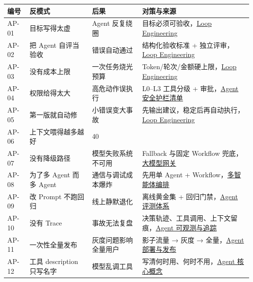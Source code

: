 \documentclass[9pt,a4paper,twocolumn]{ctexart}
\begin{document}
{\footnotesize
\begin{tabular}{|p{}|p{}|p{}|p{}|}
\hline
\textbf{编号} & \textbf{反模式} & \textbf{后果} & \textbf{对策与来源} \\
\hline
AP-01 & 目标写得太虚 & Agent 反复绕圈 & 目标必须可验收，\href{../04-工程实践/02-Loop工程.md}{Loop Engineering} \\
\hline
AP-02 & 把 Agent 自评当验收 & 错误自动通过 & 结构化验收标准 + 独立评审，\href{../04-工程实践/02-Loop工程.md}{Loop Engineering} \\
\hline
AP-03 & 没有成本上限 & 一次任务烧光预算 & Token/轮次/金额硬上限，\href{../04-工程实践/02-Loop工程.md}{Loop Engineering} \\
\hline
AP-04 & 权限给得太大 & 高危动作误执行 & L0–L3 工具分级 + 审批，\href{../06-安全与治理/01-Agent安全护栏清单.md}{Agent 安全护栏清单} \\
\hline
AP-05 & 第一版就自动修 & 小错误变大事故 & 先输出建议，稳定后再自动执行，\href{../04-工程实践/02-Loop工程.md}{Loop Engineering} \\
\hline
AP-06 & 上下文喂得越多越好 & 40\\%
\hline
AP-07 & 没有降级路径 & 模型失败系统不可用 & Fallback 与固定 Workflow 兜底，\href{../04-工程实践/04-大模型网关.md}{大模型网关} \\
\hline
AP-08 & 为了多 Agent 而多 Agent & 通信与调试成本爆炸 & 先用单 Agent + Workflow，\href{../02-Agent/03-多智能体编排.md}{多智能体编排} \\
\hline
AP-09 & 改 Prompt 不跑回归 & 线上静默退化 & 离线黄金集 + 回归门禁，\href{../05-评测与质量/01-Agent评测体系.md}{Agent 评测体系} \\
\hline
AP-10 & 没有 Trace & 事故无法复盘 & 决策轨迹、工具调用、上下文留痕，\href{../04-工程实践/05-Agent可观测与追踪.md}{Agent 可观测与追踪} \\
\hline
AP-11 & 一次性全量发布 & 灰度问题影响全量用户 & 影子流量 → 灰度 → 全量，\href{../04-工程实践/06-Agent部署与发布.md}{Agent 部署与发布} \\
\hline
AP-12 & 工具 description 只写名字 & 模型乱调工具 & 写清何时用、何时不用，\href{../02-Agent/01-Agent核心概念.md}{Agent 核心概念} \\
\hline
\end{tabular}
}
\end{document}
